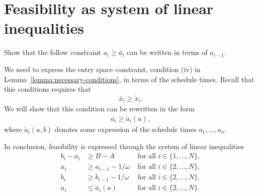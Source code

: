 \documentclass[a4paper]{article}
\theoremstyle{definition}
\theoremstyle{plain}
\begin{document}
\section{Feasibility as system of linear inequalities}

{\color{Navy} Show that the follow constraint $a_{i} \geq \bar{a}_{i}$ can be written in terms of $a_{i-1}$.}

We need to express the entry space constraint, condition (iv) in
Lemma~\ref{lemma:necessary-conditions}, in terms of the schedule times. Recall
that this conditions requires that
\begin{align}
  \bar{x}_{i} \geq \check{x}_{i} .
\end{align}
We will show that this condition can be rewritten in the form
\begin{align}
  a_{i} \geq \check{a}_{i}(a) ,
\end{align}
where $\check{a}_{i}(a,b)$ denotes some expression of the schedule times
$a_{1}, \dots, a_{n}$.

In conclusion, feasibility is expressed through the system of linear
inequalities
\begin{subequations}
\begin{align}
  b_{i} - a_{i} &\geq B - A &\text{ for all } i \in \{1, \dots, N\}, \\
  a_{i} &\geq  a_{i-1} - 1/\omega &\text{ for all } i \in \{2, \dots, N\} , \\
  b_{i} &\geq  b_{i-1} - 1/\omega &\text{ for all } i \in \{2, \dots, N\} , \\
  a_{i} &\leq \check{a}_{i}(a) &\text{ for all } i \in \{2, \dots, N \} .
\end{align}
\end{subequations}
\end{document}

